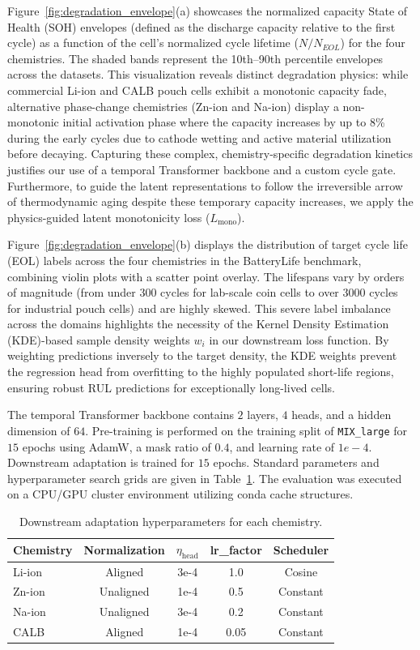 \documentclass[a4paper,fleqn]{cas-dc}
\begin{document}
Figure~\ref{fig:degradation_envelope}(a) showcases the normalized capacity State of Health (SOH) envelopes (defined as the discharge capacity relative to the first cycle) as a function of the cell's normalized cycle lifetime ($N / N_{EOL}$) for the four chemistries. The shaded bands represent the 10th--90th percentile envelopes across the datasets. This visualization reveals distinct degradation physics: while commercial Li-ion and CALB pouch cells exhibit a monotonic capacity fade, alternative phase-change chemistries (Zn-ion and Na-ion) display a non-monotonic initial activation phase where the capacity increases by up to 8\% during the early cycles due to cathode wetting and active material utilization before decaying. Capturing these complex, chemistry-specific degradation kinetics justifies our use of a temporal Transformer backbone and a custom cycle gate. Furthermore, to guide the latent representations to follow the irreversible arrow of thermodynamic aging despite these temporary capacity increases, we apply the physics-guided latent monotonicity loss ($L_{\text{mono}}$).

Figure~\ref{fig:degradation_envelope}(b) displays the distribution of target cycle life (EOL) labels across the four chemistries in the BatteryLife benchmark, combining violin plots with a scatter point overlay. The lifespans vary by orders of magnitude (from under 300 cycles for lab-scale coin cells to over 3000 cycles for industrial pouch cells) and are highly skewed. This severe label imbalance across the domains highlights the necessity of the Kernel Density Estimation (KDE)-based sample density weights $w_i$ in our downstream loss function. By weighting predictions inversely to the target density, the KDE weights prevent the regression head from overfitting to the highly populated short-life regions, ensuring robust RUL predictions for exceptionally long-lived cells.

The temporal Transformer backbone contains $2$ layers, $4$ heads, and a hidden dimension of $64$. Pre-training is performed on the training split of \texttt{MIX\_large} for $15$ epochs using AdamW, a mask ratio of $0.4$, and learning rate of $1e-4$. Downstream adaptation is trained for $15$ epochs. Standard parameters and hyperparameter search grids are given in Table~\ref{tbl:hyperparams}. The evaluation was executed on a CPU/GPU cluster environment utilizing conda cache structures.

\begin{table}[t]
\caption{Downstream adaptation hyperparameters for each chemistry.}
\label{tbl:hyperparams}
\centering
\begin{tabular}{lcccc}
\toprule
Chemistry & Normalization & $\eta_{\text{head}}$ & lr\_factor & Scheduler \\
\midrule
Li-ion & Aligned & 3e-4 & 1.0 & Cosine \\
Zn-ion & Unaligned & 1e-4 & 0.5 & Constant \\
Na-ion & Unaligned & 3e-4 & 0.2 & Constant \\
CALB & Aligned & 1e-4 & 0.05 & Constant \\
\bottomrule
\end{tabular}
\end{table}
\end{document}
